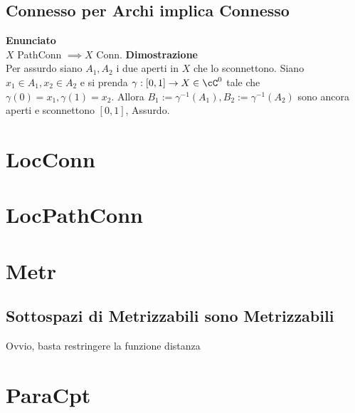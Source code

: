 \documentclass[a4paper,11pt,NoNotes,GeneralMath]{stdmdoc}
\newcommand{\Enunciato}{\vskip 0.05cm \noindent \textbf{Enunciato} \\ }
\renewcommand{\Dimostrazione}{\vskip 0.05cm \noindent \textbf{Dimostrazione} \\ }
\begin{document}
	\subsection*{Connesso per Archi implica Connesso}
	\Enunciato $X$ PathConn $\implies X$ Conn.
	\Dimostrazione Per assurdo siano $A_1, A_2$ i due aperti in $X$ che lo sconnettono. Siano $x_1 \in A_1, x_2 \in A_2$ e si prenda $\gamma: [0,1] \rar X \in \cC^0$ tale che $\gamma(0) = x_1, \gamma(1) = x_2$. Allora $B_1 := \gamma^{-1}(A_1), B_2 := \gamma^{-1}(A_2)$ sono ancora aperti e sconnettono $[0,1]$, Assurdo.

	\section*{LocConn}
	\section*{LocPathConn}
	\section*{Metr}
	\subsection*{Sottospazi di Metrizzabili sono Metrizzabili}
	Ovvio, basta restringere la funzione distanza

	\section*{ParaCpt}
\end{document}

